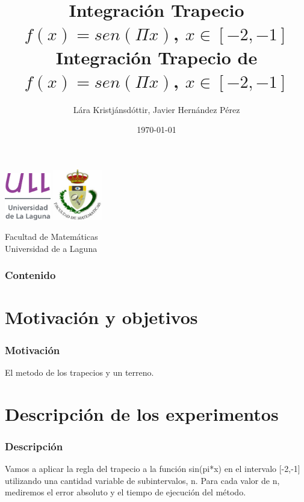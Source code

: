 \documentclass{beamer}
\title{Integración Trapecio \\ $f(x)=sen(\Pi x)$, $x \in [-2,-1]$}
\author{Lára Kristjánsdóttir, Javier Hernández Pérez}
\date{\today}
\begin{document}
\begin{frame}
  \includegraphics[width=0.15\textwidth]{img/ullesc.eps}
  \hspace*{7.5cm}
  \includegraphics[width=0.16\textwidth]{img/fmatesc.eps}
  \titlepage
  \begin{scriptsize}
    \begin{center}
    \title{Integración Trapecio de $f(x)=sen(\Pi x)$, $x \in [-2,-1]$}
      Facultad de Matemáticas \\Universidad de a Laguna
    \end{center}
  \end{scriptsize}
\end{frame}
\begin{frame}
  \frametitle{Contenido}
  \tableofcontents
\end{frame} 
\section{Motivación y objetivos}
\begin{frame}
\frametitle{Motivación}

El metodo de los trapecios y un terreno.
\end{frame}
\section{Descripción de los experimentos}
\begin{frame}
  \frametitle{Descripción}
  Vamos a aplicar la regla del trapecio a la función sin(pi*x) en el intervalo [-2,-1] utilizando una cantidad variable de subintervalos, n. Para cada valor de n, mediremos el error absoluto y el tiempo de ejecución del método.
\end{frame}
\end{document}
